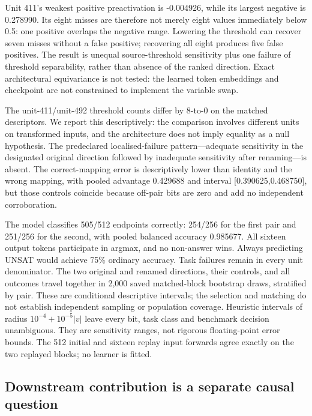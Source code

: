 \documentclass[
  british,
  11pt,
  a4paper,
]{article}
\begin{document}
Unit 411's weakest positive preactivation is -0.004926, while its
largest negative is 0.278990. Its eight misses are therefore not merely
eight values immediately below 0.5: one positive overlaps the negative
range. Lowering the threshold can recover seven misses without a false
positive; recovering all eight produces five false positives. The result
is unequal source-threshold sensitivity plus one failure of threshold
separability, rather than absence of the ranked direction. Exact
architectural equivariance is not tested: the learned token embeddings
and checkpoint are not constrained to implement the variable swap.

The unit-411/unit-492 threshold counts differ by 8-to-0 on the matched
descriptors. We report this descriptively: the comparison involves
different units on transformed inputs, and the architecture does not
imply equality as a null hypothesis. The predeclared localised-failure
pattern---adequate sensitivity in the designated original direction
followed by inadequate sensitivity after renaming---is absent. The
correct-mapping error is descriptively lower than identity and the wrong
mapping, with pooled advantage 0.429688 and interval
{[}0.390625,0.468750{]}, but those controls coincide because off-pair
bits are zero and add no independent corroboration.

The model classifies 505/512 endpoints correctly: 254/256 for the first
pair and 251/256 for the second, with pooled balanced accuracy 0.985677.
All sixteen output tokens participate in argmax, and no non-answer wins.
Always predicting UNSAT would achieve 75\% ordinary accuracy. Task
failures remain in every unit denominator. The two original and renamed
directions, their controls, and all outcomes travel together in 2,000
saved matched-block bootstrap draws, stratified by pair. These are
conditional descriptive intervals; the selection and matching do not
establish independent sampling or population coverage. Heuristic
intervals of radius \(10^{-4}+10^{-5}|v|\) leave every bit, task class
and benchmark decision unambiguous. They are sensitivity ranges, not
rigorous floating-point error bounds. The 512 initial and sixteen replay
input forwards agree exactly on the two replayed blocks; no learner is
fitted.

\subsection{Downstream contribution is a separate causal
question}\label{downstream-contribution-is-a-separate-causal-question}
\end{document}
